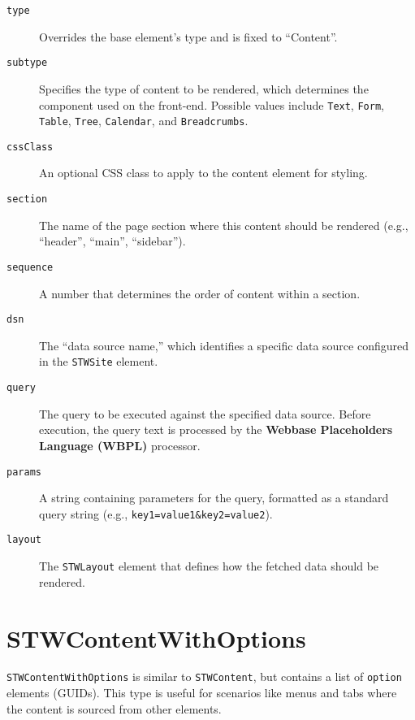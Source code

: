 \begin{description}
\item[\texttt{type}] Overrides the base element's type and is fixed to ``Content''.
\item[\texttt{subtype}] Specifies the type of content to be rendered, which determines the component used on the front-end. Possible values include \texttt{Text}, \texttt{Form}, \texttt{Table}, \texttt{Tree}, \texttt{Calendar}, and \texttt{Breadcrumbs}.
\item[\texttt{cssClass}] An optional CSS class to apply to the content element for styling.
\item[\texttt{section}] The name of the page section where this content should be rendered (e.g., ``header'', ``main'', ``sidebar'').
\item[\texttt{sequence}] A number that determines the order of content within a section.
\item[\texttt{dsn}] The ``data source name,'' which identifies a specific data source configured in the \texttt{STWSite} element.
\item[\texttt{query}] The query to be executed against the specified data source. Before execution, the query text is processed by the \textbf{Webbase Placeholders Language (WBPL)} processor.
\item[\texttt{params}] A string containing parameters for the query, formatted as a standard query string (e.g., \texttt{key1=value1\&key2=value2}).
\item[\texttt{layout}] The \texttt{STWLayout} element that defines how the fetched data should be rendered.
\end{description}

\section{STWContentWithOptions}

\texttt{STWContentWithOptions} is similar to \texttt{STWContent}, but contains a list of \texttt{option} elements (GUIDs). This type is useful for scenarios like menus and tabs where the content is sourced from other elements.

